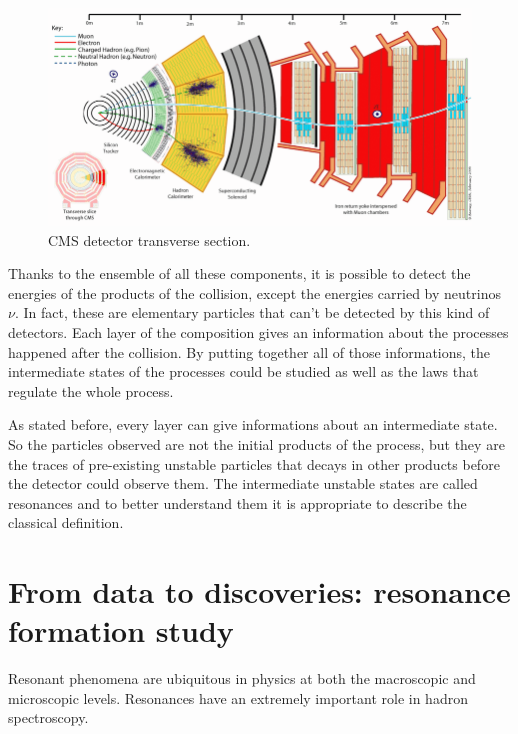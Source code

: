 \begin{figure}[t]
	\begin{center}
		\includegraphics[width=1.0\textwidth]{Images/LHC/cms_transverse_section.png}
		\caption{CMS detector transverse section.}
		\label{fig:CMS_TRANSVERSE_SECTION}
	\end{center}
\end{figure}

Thanks to the ensemble of all these components, it is possible to detect the energies of the products of the collision, except the energies carried by neutrinos $\nu$. In fact, these are elementary particles that can't be detected by this kind of detectors. Each layer of the composition gives an information about the processes happened after the collision. By putting together all of those informations, the intermediate states of the processes could be studied as well as the laws that regulate the whole process.

As stated before, every layer can give informations about an intermediate state. So the particles observed are not the initial products of the process, but they are the traces of pre-existing unstable particles that decays in other products before the detector could observe them. The intermediate unstable states are called resonances and to better understand them it is appropriate to describe the classical definition.





\section{From data to discoveries: resonance formation study}
Resonant phenomena are ubiquitous in physics at both the macroscopic and microscopic levels. Resonances have an extremely important role in hadron spectroscopy.


